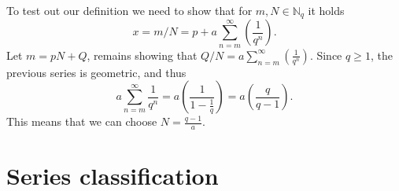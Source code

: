 \documentclass{article}
\theoremstyle{remark}
\begin{document}
\begin{enumerate}
\begin{enumerate}
        To test out our definition we need to show that for $m,N \in \mathbb{N}_q$ it holds
        \[
        x = m/N = p + a\sum_{n=m}^{\infty} \left(\frac{1}{q^n} \right).
        \]
        Let $m = pN+Q$, remains showing that $Q/N = a\sum_{n=m}^{\infty} \left(\frac{1}{q^n} \right)$.
        Since $q \geq 1$, the previous series is geometric, and thus 
        \[
        a\sum_{n=m}^{\infty}\frac{1}{q^n} = a \left( \frac{1}{1-\frac{1}{q}} \right) = a \left(\frac{q}{q-1}\right).
        \]
        This means that we can choose $N = \frac{q-1}{a}$.

    \end{enumerate}

\end{enumerate}
\section*{Series classification}
\end{document}
